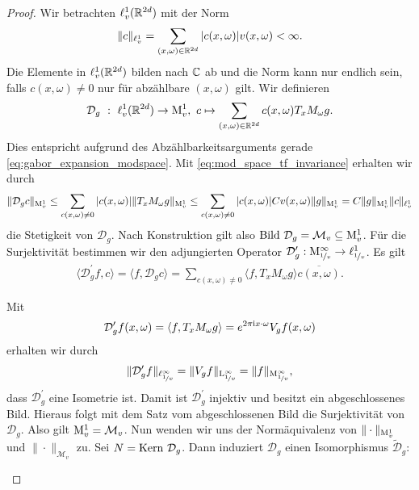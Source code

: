 \begin{proof}
	Wir betrachten $ \ell^1_v(\mathbb{R}^{2d}) $ mit der Norm 
	\begin{align*}
	\| c \|_{\ell^1_v} 
	=
	\sum \limits_{(x,\omega) \in \mathbb{R}^{2d}} |c(x,\omega)| v(x,\omega) < \infty.
	\end{align*}
	Die Elemente in $ \ell^1_v(\mathbb{R}^{2d}) $ bilden nach $ \mathbb{C} $ ab und die Norm kann nur endlich sein, falls $ c(x,\omega) \neq 0 $ nur für abzählbare $ (x,\omega) $ gilt. Wir definieren
	\begin{align*}
	\mathcal{D}_g \ : \ \ell^1_v(\mathbb{R}^{2d}) \to \mathrm{M}^1_v , \
	c \mapsto \sum \limits_{(x, \omega) \in \mathbb{R}^{2d} } c(x,\omega) T_x M_\omega g.
  	\end{align*}
  	Dies entspricht aufgrund des Abzählbarkeitsarguments gerade \eqref{eq:gabor_expansion_modspace}. Mit \eqref{eq:mod_space_tf_invariance} erhalten wir durch
  	\begin{align*}
  	\| \mathcal{D}_g c \|_{\mathrm{M}^1_v} 
  	\leq 
  	\sum \limits_{c(x,\omega) \neq 0}
  	|c(x,\omega) | \| T_x M_\omega g \|_{\mathrm{M}^1_v} 
  	\leq
  	\sum \limits_{c(x,\omega) \neq 0}
  	|c(x,\omega) | C v(x,\omega) \|  g \|_{\mathrm{M}^1_v}
  	=
  	C \|  g \|_{\mathrm{M}^1_v} \| c\|_{\ell^1_v} 
  	\end{align*}
  	die Stetigkeit von $ \mathcal{D}_g $.
  	Nach Konstruktion gilt also $ \Bild \ \mathcal{D}_g = \mathcal{M}_v  \subseteq \M^1_v$.
  	Für die Surjektivität bestimmen wir den adjungierten Operator
	$ \mathcal{D}_g^\prime  : \mathrm{M}^\infty_{\nicefrac{1}{v}} \to \ell^1_{\nicefrac{1}{v}}$.
	Es gilt
	\begin{align*}
	\langle \mathcal{D}_g^\prime f , c \rangle 
	=
	\langle f, \mathcal{D}_g c \rangle
	=
	\sum \limits_{c(x,\omega) \neq 0} 
	\langle f, T_x M_\omega g \rangle \overline{c(x,\omega)}.
	\end{align*}
	
	Mit
	\begin{align*}
	\mathcal{D}_g^\prime f(x,\omega) 
	= 
	\langle f, T_x M_\omega g \rangle
	=
	e^{2\pi \textrm{i} x \cdot \omega} V_g f(x,\omega)
	\end{align*}
	erhalten wir durch
	\begin{align*}
	\| \mathcal{D}_g^\prime f \|_{\ell^\infty_{\nicefrac{1}{v}}}
	= \| V_g f \|_{\mathrm{L}^\infty_{\nicefrac{1}{v}}} 
	=  \| f \|_{\mathrm{M}_{\nicefrac{1}{v}}^\infty}, 
	\end{align*}
	dass $ \mathcal{D}_g^\prime $ eine Isometrie ist.
	Damit ist $ \mathcal{D}_g^\prime $ injektiv und besitzt ein abgeschlossenes Bild.
	Hieraus folgt mit dem Satz vom abgeschlossenen Bild die Surjektivität von $ \mathcal{D}_g $. Also gilt $ \mathrm{M}_v^1 = \mathcal{M}_v $.
	Nun wenden wir uns der Normäquivalenz von $ \| \cdot \|_{\mathrm{M}_v^1} $ und $ \| \cdot
	 \|_{\mathcal{M}_v} $ zu.
	Sei $ N = \mathrm{Kern} \ \mathcal{D}_g $. Dann induziert $ \mathcal{D}_g $ einen Isomorphismus $ \tilde{\mathcal{D}}_g $:
	\begin{center}
\end{center}
\end{proof}
